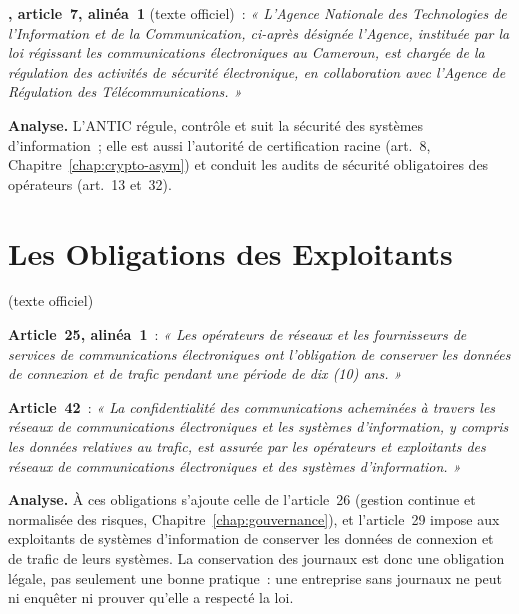 \begin{boxjuris}
\textbf{, article~7, alinéa~1} (texte officiel)~:
\textit{« L'Agence Nationale des Technologies de l'Information et de la
Communication, ci-après désignée l'Agence, instituée par la loi régissant
les communications électroniques au Cameroun, est chargée de la
régulation des activités de sécurité électronique, en collaboration avec
l'Agence de Régulation des Télécommunications. »}

\medskip
\textbf{Analyse.} L'ANTIC régule, contrôle et suit la sécurité des
systèmes d'information~; elle est aussi l'autorité de certification racine
(art.~8, Chapitre~\ref{chap:crypto-asym}) et conduit les audits de
sécurité obligatoires des opérateurs (art.~13 et~32).
\end{boxjuris}

\section{Les Obligations des Exploitants}
\label{sec:c11-obligations}

\begin{boxjuris}
\textbf{} (texte officiel)

\medskip
\textbf{Article~25, alinéa~1}~: \textit{« Les opérateurs de réseaux et
les fournisseurs de services de communications électroniques ont
l'obligation de conserver les données de connexion et de trafic pendant
une période de dix (10) ans. »}

\medskip
\textbf{Article~42}~: \textit{« La confidentialité des communications
acheminées à travers les réseaux de communications électroniques et les
systèmes d'information, y compris les données relatives au trafic, est
assurée par les opérateurs et exploitants des réseaux de communications
électroniques et des systèmes d'information. »}

\medskip
\textbf{Analyse.} À ces obligations s'ajoute celle de l'article~26
(gestion continue et normalisée des risques, Chapitre~\ref{chap:gouvernance}),
et l'article~29 impose aux exploitants de systèmes d'information de
conserver les données de connexion et de trafic de leurs systèmes. La
conservation des journaux est donc une obligation légale, pas seulement
une bonne pratique~: une entreprise sans journaux ne peut ni enquêter ni
prouver qu'elle a respecté la loi.
\end{boxjuris}

